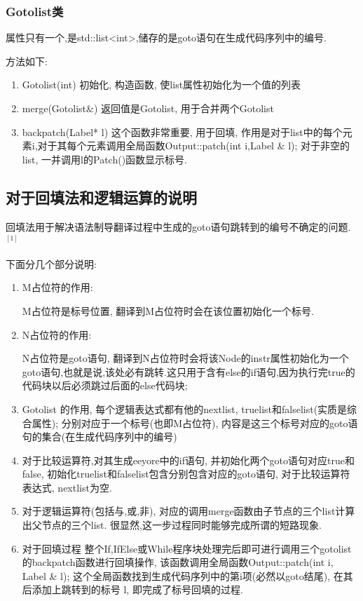 \documentclass[UTF8]{article}
\begin{document}
\subsubsection{Gotolist类}
属性只有一个,是std::list<int>,储存的是goto语句在生成代码序列中的编号.

方法如下:
\begin{enumerate}
\item Gotolist(int) 初始化, 构造函数, 使list属性初始化为一个值的列表
\item merge(Gotolist\&) 返回值是Gotolist, 用于合并两个Gotolist
\item backpatch(Label* l) 这个函数非常重要, 用于回填, 作用是对于list中的每个元素i,对于其每个元素调用全局函数Output::patch(int i,Label \& l); 对于非空的list, 一并调用l的Patch()函数显示标号.
\end{enumerate}
\subsection{对于回填法和逻辑运算的说明}
回填法用于解决语法制导翻译过程中生成的goto语句跳转到的编号不确定的问题.$^[1]$

下面分几个部分说明:
\begin{enumerate}[(1)]
\item M占位符的作用: 

M占位符是标号位置, 翻译到M占位符时会在该位置初始化一个标号.
\item N占位符的作用:

N占位符是goto语句, 翻译到N占位符时会将该Node的instr属性初始化为一个goto语句,也就是说,该处必有跳转.这只用于含有else的if语句,因为执行完true的代码块以后必须跳过后面的else代码块;
\item Gotolist 的作用, 每个逻辑表达式都有他的nextlist, truelist和falselist(实质是综合属性);  分别对应于一个标号(也即M占位符), 内容是这三个标号对应的goto语句的集合(在生成代码序列中的编号)

\item 对于比较运算符,对其生成eeyore中的if语句, 并初始化两个goto语句对应true和false, 初始化truelist和falselist包含分别包含对应的goto语句, 对于比较运算符表达式, nextlist为空.

\item 对于逻辑运算符(包括与,或,非), 对应的调用merge函数由子节点的三个list计算出父节点的三个list. 很显然,这一步过程同时能够完成所谓的短路现象.

\item 对于回填过程 整个If,IfElse或While程序块处理完后即可进行调用三个gotolist的backpatch函数进行回填操作, 该函数调用全局函数Output::patch(int i, Label \& l);  这个全局函数找到生成代码序列中的第i项(必然以goto结尾), 在其后添加上跳转到的标号 l, 即完成了标号回填的过程.
\end{enumerate}
\end{document}
